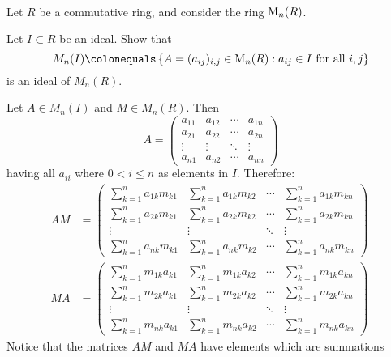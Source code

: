 \begin{problem} \\
  Let $R$ be a commutative ring, and consider the ring $\operatorname{M}_n(R)$.  
  \begin{enumalph}
    \item Let $I \subset R$ be an ideal.
      Show that
        \[
          M_n(I) \colonequals \left\{A=(a_{ij})_{i,j} \in \M_n(R) : a_{ij}
          \in I \text{ for all $i,j$} \right\}
        \]
      is an ideal of $M_n(R)$.
      \begin{Answer}
        Let $A \in M_n(I)$ and $M \in M_n(R)$. Then
        \[ A = \begin{pmatrix}
          a_{11} & a_{12} & \cdots & a_{1n} \\
          a_{21} & a_{22} & \cdots & a_{2n} \\
          \vdots & \vdots & \ddots & \vdots \\
          a_{n1} & a_{n2} & \cdots & a_{nn}
        \end{pmatrix} \] having all $a_{ii}$ where $0 < i \leq n$ as elements in $I$.
        Therefore:
        \begin{align}
          AM &= \begin{pmatrix}
            \sum_{k=1}^n a_{1k} m_{k1} & \sum_{k=1}^n a_{1k} m_{k2} & \cdots & \sum_{k=1}^n a_{1k} m_{kn} \\
            \sum_{k=1}^n a_{2k} m_{k1} & \sum_{k=1}^n a_{2k} m_{k2} & \cdots & \sum_{k=1}^n a_{2k} m_{kn} \\
            \vdots & \vdots & \ddots & \vdots \\
            \sum_{k=1}^n a_{nk} m_{k1} & \sum_{k=1}^n a_{nk} m_{k2} & \cdots & \sum_{k=1}^n a_{nk} m_{kn}
          \end{pmatrix}~\label{M1} \\
          MA &= \begin{pmatrix}
            \sum_{k=1}^n m_{1k} a_{k1} & \sum_{k=1}^n m_{1k} a_{k2} & \cdots & \sum_{k=1}^n m_{1k} a_{kn} \\
            \sum_{k=1}^n m_{2k} a_{k1} & \sum_{k=1}^n m_{2k} a_{k2} & \cdots & \sum_{k=1}^n m_{2k} a_{kn} \\
            \vdots & \vdots & \ddots & \vdots \\
            \sum_{k=1}^n m_{nk} a_{k1} & \sum_{k=1}^n m_{nk} a_{k2} & \cdots & \sum_{k=1}^n m_{nk} a_{kn}
          \end{pmatrix}~\label{M2}
        \end{align}
        Notice that the matrices $AM$ and $MA$ have elements which are summations

\end{Answer}
\end{enumalph}
\end{problem}
